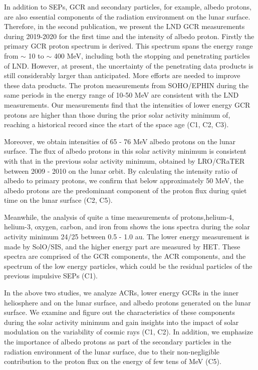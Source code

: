 In addition to \acp{SEP}, \ac{GCR} and secondary particles, for example, albedo protons, are also essential components of the radiation environment on the lunar surface. Therefore, in the second publication, we present the \ac{LND} \ac{GCR} measurements during 2019-2020 for the first time and the intensity of albedo proton. Firstly the primary \ac{GCR} proton spectrum is derived. This spectrum spans the energy range from $\sim$ 10 to $\sim$ 400 MeV, including both the stopping and penetrating particles of \ac{LND}. However, at present, the uncertainty of the penetrating data products is still considerably larger than anticipated. More efforts are needed to improve these data products. The proton measurements from \acs{SOHO}/\acs{EPHIN} during the same periods in the energy range of 10-50 MeV are consistent with the \ac{LND} measurements. Our measurements find that the intensities of lower energy \ac{GCR} protons are higher than those during the prior solar activity minimum of, reaching a historical record since the start of the space age (C1, C2, C3).

Moreover, we obtain intensities of 65 - 76 MeV albedo protons on the lunar surface. The flux of albedo protons in this solar activity minimum is consistent with that in the previous solar activity minimum, obtained by \acs{LRO}/\acs{CRaTER} between 2009 - 2010 on the lunar orbit. By calculating the intensity ratio of albedo to primary protons, we confirm that below approximately 50 MeV, the albedo protons are the predominant component of the proton flux during quiet time on the lunar surface (C2, C5).  %


Meanwhile, the analysis of quite a time measurements of protons,helium-4, helium-3, oxygen, carbon, and iron from \citet{Mason-2021-SolOQuietTime} shows the ions spectra during the solar activity minimum 24/25 between 0.5 - 1.0 au. The lower energy measurement is made by \acs{SolO}/\acs{SIS}, and the higher energy part are measured by \acs{HET}. These spectra are comprised of the \ac{GCR} components, the \ac{ACR} components, and the spectrum of the low energy particles, which could be the residual particles of the previous impulsive \acp{SEP} (C1). %

In the above two studies, we analyze \acp{ACR}, lower energy \acp{GCR} in the inner heliosphere and on the lunar surface, and albedo protons generated on the lunar surface. We examine and figure out the characteristics of these components during the solar activity minimum and gain insights into the impact of solar modulation on the variability of cosmic rays (C1, C2). In addition, we emphasize the importance of albedo protons as part of the secondary particles in the radiation environment of the lunar surface, due to their non-negligible contribution to the proton flux on the energy of few tens of MeV (C5).


